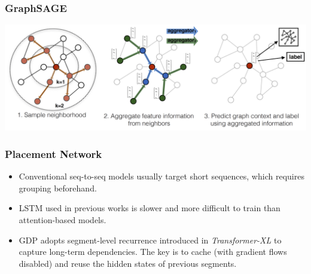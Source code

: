 \documentclass[12pt,aspectratio=169]{beamer}
\begin{document}
    \begin{frame}
        \frametitle{GraphSAGE}

        \centering
        \includegraphics[width=\textwidth]{graphsage.png}
    \end{frame}

    \begin{frame}
        \frametitle{Placement Network}

        \begin{itemize}
            \setlength{\itemsep}{.8em}
            \item Conventional seq-to-seq models usually target short sequences, which requires grouping beforehand.
            \item LSTM used in previous works is slower and more difficult to train than attention-based models.
            \item GDP adopts segment-level recurrence introduced in \textit{Transformer-XL} to capture long-term
                  dependencies. The key is to cache (with gradient flows disabled) and reuse the hidden states of
                  previous segments.
        \end{itemize}
    \end{frame}

\end{document}
